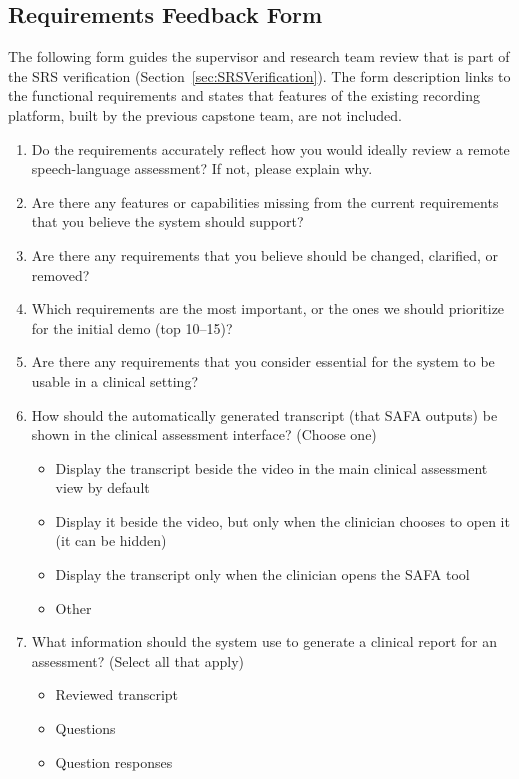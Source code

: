 \documentclass[12pt, titlepage]{article}
\renewcommand{\_}{\oldunderscore\allowbreak}
\begin{document}
\subsection{Requirements Feedback Form} \label{sec:ReqFeedbackForm}

The following form guides the supervisor and research team review that is part of the SRS verification (Section~\ref{sec:SRSVerification}).
The form description links to the functional requirements and states that features of the existing recording platform, built by the previous capstone team, are not included.

\begin{enumerate}
  \item Do the requirements accurately reflect how you would ideally review a remote speech-language assessment? If not, please explain why.
  \item Are there any features or capabilities missing from the current requirements that you believe the system should support?
  \item Are there any requirements that you believe should be changed, clarified, or removed?
  \item Which requirements are the most important, or the ones we should prioritize for the initial demo (top 10--15)?
  \item Are there any requirements that you consider essential for the system to be usable in a clinical setting?
  \item How should the automatically generated transcript (that SAFA outputs) be shown in the clinical assessment interface? (Choose one)
  \begin{itemize}
    \item Display the transcript beside the video in the main clinical assessment view by default
    \item Display it beside the video, but only when the clinician chooses to open it (it can be hidden)
    \item Display the transcript only when the clinician opens the SAFA tool
    \item Other
  \end{itemize}
  \item What information should the system use to generate a clinical report for an assessment? (Select all that apply)
  \begin{itemize}
    \item Reviewed transcript
    \item Questions
    \item Question responses

\end{itemize}
\end{enumerate}
\end{document}
